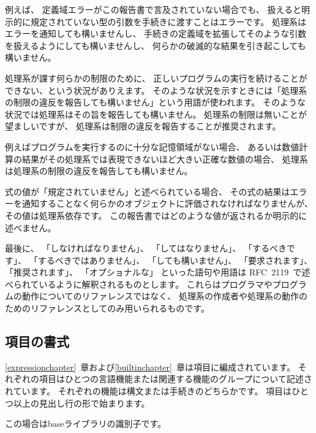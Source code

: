 例えば、
定義域エラーがこの報告書で言及されていない場合でも、
扱えると明示的に規定されていない型の引数を手続きに渡すことはエラーです。
処理系はエラーを通知しても構いませんし、
手続きの定義域を拡張してそのような引数を扱えるようにしても構いませんし、
何らかの破滅的な結果を引き起こしても構いません。

\vest 処理系が課す何らかの制限のために、
正しいプログラムの実行を続けることができない、という状況がありえます。
そのような状況を示すときには「処理系の制限の違反を報告しても構いません」という用語が使われます。
そのような状況では処理系はその旨を報告しても構いません。
処理系の制限は無いことが望ましいですが、
処理系は制限の違反を報告することが推奨されます。

\vest 例えばプログラムを実行するのに十分な記憶領域がない場合、
あるいは数値計算の結果がその処理系では表現できないほど大きい正確な数値の場合、
処理系は処理系の制限の違反を報告しても構いません。

\vest 式の値が「規定されていません」と述べられている場合、
その式の結果はエラーを通知することなく何らかのオブジェクトに評価されなければなりませんが、
その値は処理系依存です。
この報告書ではどのような値が返されるか明示的に述べません。

\vest 最後に、
「しなければなりません」、
「してはなりません」、
「するべきです」、
「するべきではありません」、
「しても構いません」、
「要求されます」、
「推奨されます」、
「オプショナルな」
といった語句や用語は
RFC~2119~\cite{rfc2119}で述べられているように解釈されるものとします。
これらはプログラマやプログラムの動作についてのリファレンスではなく、
処理系の作成者や処理系の動作のためのリファレンスとしてのみ用いられるものです。



\subsection{項目の書式}

\ref{expressionchapter}~章および\ref{builtinchapter}~章は項目に編成されています。
それぞれの項目はひとつの言語機能または関連する機能のグループについて記述されています。
それぞれの機能は構文または手続きのどちらかです。
項目はひとつ以上の見出し行の形で始まります。

\noindent{}\unpenalty

この場合はbaseライブラリの識別子です。

\noindent{}\unpenalty

